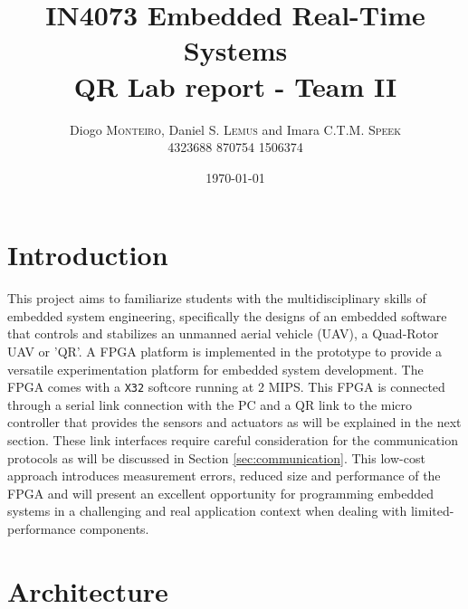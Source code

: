 \documentclass{article}
\title{IN4073 Embedded Real-Time Systems \\ QR Lab report - Team II} %
\author{Diogo \textsc{Monteiro}, Daniel S. \textsc{Lemus} and Imara C.T.M. \textsc{Speek} \\
		4323688 870754 1506374} %
\date{\today} %
\begin{document}
\maketitle %

 \begin{abstract}


 \end{abstract}


\section{Introduction}
\label{sec:introduction}
This project aims to familiarize students with the multidisciplinary skills of embedded system engineering, specifically the designs of an embedded software that controls and stabilizes an unmanned aerial vehicle (UAV), a Quad-Rotor UAV or 'QR'. A FPGA platform is implemented in the prototype to provide a versatile experimentation platform for embedded system development. The FPGA comes with a \texttt{X32} softcore running at 2 MIPS. 
This FPGA is connected through a serial link connection with the PC and a QR link to the micro controller that provides the sensors and actuators as will be explained in the next section. These link interfaces require careful consideration for the communication protocols as will be discussed in Section \ref{sec:communication}. This low-cost approach introduces measurement errors, reduced size and performance of the FPGA and will present an excellent opportunity for programming embedded systems in a challenging and real application context when dealing with limited-performance components.  



\section{Architecture}
\label{sec:architecture}
\end{document}
